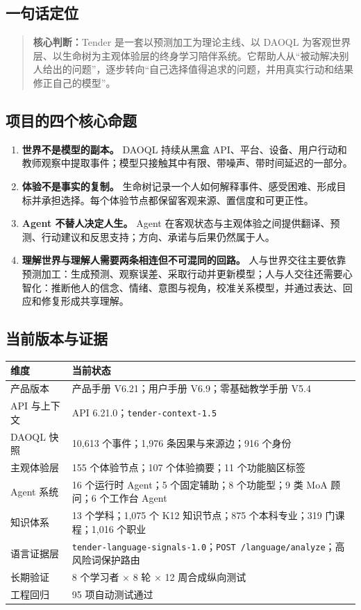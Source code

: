 \documentclass[UTF8,a4paper,11pt]{ctexart}
\newcommand{\keypoint}[1]{\begin{quote}\noindent\textbf{\color{TenderBlue}核心判断：}#1\end{quote}}
\begin{document}
\subsection{一句话定位}

\keypoint{Tender 是一套以预测加工为理论主线、以 DAOQL 为客观世界层、以生命树为主观体验层的终身学习陪伴系统。它帮助人从“被动解决别人给出的问题”，逐步转向“自己选择值得追求的问题，并用真实行动和结果修正自己的模型”。}

\subsection{项目的四个核心命题}

\begin{enumerate}
\item \textbf{世界不是模型的副本。} DAOQL 持续从黑盒 API、平台、设备、用户行动和教师观察中提取事件；模型只接触其中有限、带噪声、带时间延迟的一部分。
\item \textbf{体验不是事实的复制。} 生命树记录一个人如何解释事件、感受困难、形成目标并承担选择。每个体验节点都保留客观来源、置信度和可更正性。
\item \textbf{Agent 不替人决定人生。} Agent 在客观状态与主观体验之间提供翻译、预测、行动建议和反思支持；方向、承诺与后果仍然属于人。
\item \textbf{理解世界与理解人需要两条相连但不可混同的回路。} 人与世界交往主要依靠预测加工：生成预测、观察误差、采取行动并更新模型；人与人交往还需要心智化：推断他人的信念、情绪、意图与视角，校准关系模型，并通过表达、回应和修复形成共享理解。
\end{enumerate}

\subsection{当前版本与证据}

\begin{center}
\begin{tabularx}{\textwidth}{@{}p{4.6cm}X@{}}
\toprule
\textbf{维度} & \textbf{当前状态} \\
\midrule
产品版本 & 产品手册 V6.21；用户手册 V6.9；零基础教学手册 V5.4 \\
API 与上下文 & API 6.21.0；\texttt{tender-context-1.5} \\
DAOQL 快照 & 10,613 个事件；1,976 条因果与来源边；916 个身份 \\
主观体验层 & 155 个体验节点；107 个体验摘要；11 个功能脑区标签 \\
Agent 系统 & 16 个运行时 Agent；5 个固定辅助；8 个功能型；9 类 MoA 顾问；6 个工作台 Agent \\
知识体系 & 13 个学科；1,075 个 K12 知识节点；875 个本科专业；319 门课程；1,016 个职业 \\
语言证据层 & \texttt{tender-language-signals-1.0}；\texttt{POST /language/analyze}；高风险词保护路由 \\
长期验证 & 8 个学习者 × 8 轮 × 12 周合成纵向测试 \\
工程回归 & 95 项自动测试通过 \\
\bottomrule
\end{tabularx}
\end{center}
\end{document}
